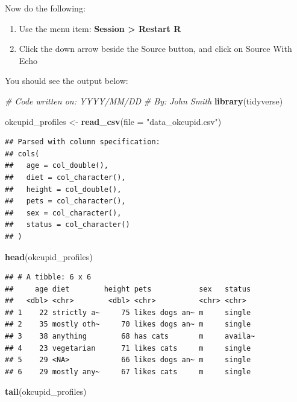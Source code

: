 \documentclass[
]{krantz}
\makeatletter
\newenvironment{Shaded}{\begin{snugshade}}{\end{snugshade}}
\newcommand{\CommentTok}[1]{\textcolor[rgb]{0.37,0.37,0.37}{\textit{#1}}}
\newcommand{\DataTypeTok}[1]{\textcolor[rgb]{0.27,0.27,0.27}{#1}}
\newcommand{\KeywordTok}[1]{\textcolor[rgb]{0.27,0.27,0.27}{\textbf{#1}}}
\newcommand{\NormalTok}[1]{#1}
\newcommand{\StringTok}[1]{\textcolor[rgb]{0.5,0.5,0.5}{#1}}
\providecommand{\tightlist}{%
  \setlength{\itemsep}{0pt}\setlength{\parskip}{0pt}}
\newenvironment{kframe}{%
\medskip{}
\setlength{\fboxsep}{.8em}
 \def\at@end@of@kframe{}%
 \ifinner\ifhmode%
  \def\at@end@of@kframe{\end{minipage}}%
  \begin{minipage}{\columnwidth}%
 \fi\fi%
 \def\FrameCommand##1{\hskip\@totalleftmargin \hskip-\fboxsep
 \colorbox{shadecolor}{##1}\hskip-\fboxsep
     \hskip-\linewidth \hskip-\@totalleftmargin \hskip\columnwidth}%
 \MakeFramed {\advance\hsize-\width
   \@totalleftmargin\z@ \linewidth\hsize
   \@setminipage}}%
 {\par\unskip\endMakeFramed%
 \at@end@of@kframe}
\renewenvironment{Shaded}{\begin{kframe}}{\end{kframe}}
\makeatother
\begin{document}
Now do the following:

\begin{enumerate}
\def\labelenumi{\arabic{enumi}.}
\tightlist
\item
  Use the menu item: \textbf{Session \textgreater{} Restart R}
\item
  Click the down arrow beside the Source button, and click on Source With Echo
\end{enumerate}

You should see the output below:

\begin{Shaded}
\begin{Highlighting}[]
\CommentTok{# Code written on: YYYY/MM/DD }
\CommentTok{# By: John Smith}
\KeywordTok{library}\NormalTok{(tidyverse)}

\NormalTok{okcupid_profiles <-}\StringTok{ }\KeywordTok{read_csv}\NormalTok{(}\DataTypeTok{file =} \StringTok{"data_okcupid.csv"}\NormalTok{)}
\end{Highlighting}
\end{Shaded}

\begin{verbatim}
## Parsed with column specification:
## cols(
##   age = col_double(),
##   diet = col_character(),
##   height = col_double(),
##   pets = col_character(),
##   sex = col_character(),
##   status = col_character()
## )
\end{verbatim}

\begin{Shaded}
\begin{Highlighting}[]
\KeywordTok{head}\NormalTok{(okcupid_profiles)}
\end{Highlighting}
\end{Shaded}

\begin{verbatim}
## # A tibble: 6 x 6
##     age diet        height pets           sex   status 
##   <dbl> <chr>        <dbl> <chr>          <chr> <chr>  
## 1    22 strictly a~     75 likes dogs an~ m     single 
## 2    35 mostly oth~     70 likes dogs an~ m     single 
## 3    38 anything        68 has cats       m     availa~
## 4    23 vegetarian      71 likes cats     m     single 
## 5    29 <NA>            66 likes dogs an~ m     single 
## 6    29 mostly any~     67 likes cats     m     single
\end{verbatim}

\begin{Shaded}
\begin{Highlighting}[]
\KeywordTok{tail}\NormalTok{(okcupid_profiles)}
\end{Highlighting}
\end{Shaded}
\end{document}
